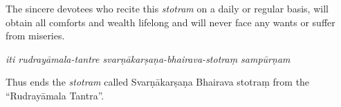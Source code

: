 \documentclass[12pt,oneside,a4paper]{article}
\newenvironment{shloka}[1]
  {\bigskip\center#1\varwidth{\linewidth}}
  {\endvarwidth\endcenter\bigskip}
\newcommand{\tl}[1]{\emph{#1}}
\begin{document}
The sincere devotees who recite this \tl{stotram} on a daily or regular basis,
will obtain all comforts and wealth lifelong and will never face any wants or
suffer from miseries.

\begin{shloka}\itshape
  iti rudrayāmala-tantre svarṇākarṣaṇa-bhairava-stotraṃ sampūrṇam
\end{shloka}

Thus ends the \tl{stotram} called Svarṇākarṣaṇa Bhairava stotraṃ from the
``Rudrayāmala Tantra''.
\end{document}
